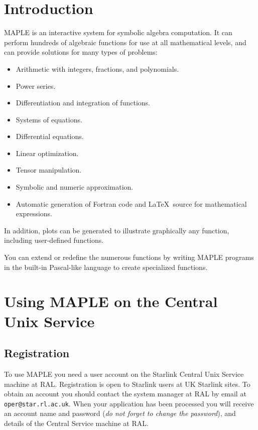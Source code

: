 \documentclass[twoside,11pt]{starlink}
\begin{document}
\scfrontmatter


\section{Introduction}

MAPLE is an interactive system for symbolic algebra computation. It can
perform hundreds of algebraic functions for use at all mathematical
levels, and can provide solutions for many types of problems:

\begin{itemize}
\item Arithmetic with integers, fractions, and polynomials.
\item Power series.
\item Differentiation and integration of functions.
\item Systems of equations.
\item Differential equations.
\item Linear optimization.
\item Tensor manipulation.
\item Symbolic and numeric approximation.
\item Automatic generation of Fortran code and \LaTeX\ source for mathematical
expressions.
\end{itemize}

In addition, plots can be generated to illustrate graphically any
function, including user-defined functions.

You can extend or redefine the numerous functions by writing MAPLE
programs in the built-in Pascal-like language to create specialized
functions.

\section{
Using MAPLE on the Central Unix Service}

\subsection{Registration}

To use MAPLE you need a user account on the Starlink Central Unix
Service machine at RAL.  Registration is open to Starlink users at UK
Starlink sites.  To obtain an account you should contact the system
manager at RAL by email at \texttt{oper@star.rl.ac.uk}.  When your
application has been processed you will receive an account name and
password (\textit{do not forget to change the password}), and details
of the Central Service machine at RAL.
\end{document}
